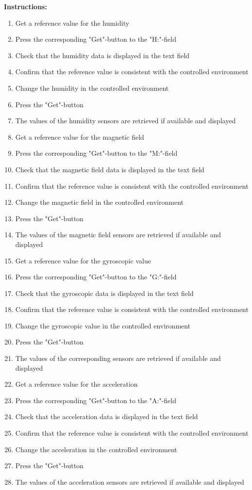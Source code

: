 \documentclass[a4paper]{article}
\newlength{\testlabellength}
\newenvironment{testlist}{\begin{enumerate}[label=\bfseries Instruction \thesubsection.\arabic* , labelindent=0pt, labelwidth=\testlabellength , leftmargin=2cm]}{\end{enumerate}}
\newenvironment{instruction}{
\textbf{Instructions:}
\begin{enumerate}[label=\bfseries  \arabic*., labelindent=0cm, labelwidth=2cm , leftmargin=1cm]
}
{\end{enumerate}}
\begin{document}
\begin{appendices}
\begin{testlist}
\begin{instruction}
			\item Get a reference value for the humidity
			\item Press the corresponding "Get"-button to the "H:"-field
			\item Check that the humidity data is displayed in the text field
			\item Confirm that the reference value is consistent with the controlled environment
			\item Change the humidity in the controlled environment
			\item Press the "Get"-button
			\item The values of the humidity sensors are retrieved if available and displayed
			
			\item Get a reference value for the magnetic field
			\item Press the corresponding "Get"-button to the "M:"-field
			\item Check that the magnetic field data is displayed in the text field
			\item Confirm that the reference value is consistent with the controlled environment
			\item Change the magnetic field in the controlled environment
			\item Press the "Get"-button
			\item The values of the magnetic field sensors are retrieved if available and displayed
			
			\item Get a reference value for the gyroscopic value
			\item Press the corresponding "Get"-button to the "G:"-field
			\item Check that the gyroscopic data is displayed in the text field
			\item Confirm that the reference value is consistent with the controlled environment
			\item Change the gyroscopic value in the controlled environment
			\item Press the "Get"-button
			\item The values of the corresponding sensors are retrieved if available and displayed
			
			\item Get a reference value for the acceleration
			\item Press the corresponding "Get"-button to the "A:"-field
			\item Check that the acceleration data is displayed in the text field
			\item Confirm that the reference value is consistent with the controlled environment
			\item Change the acceleration in the controlled environment
			\item Press the "Get"-button
			\item The values of the acceleration sensors are retrieved if available and displayed
		\end{instruction}


\end{testlist}
\end{appendices}
\end{document}
